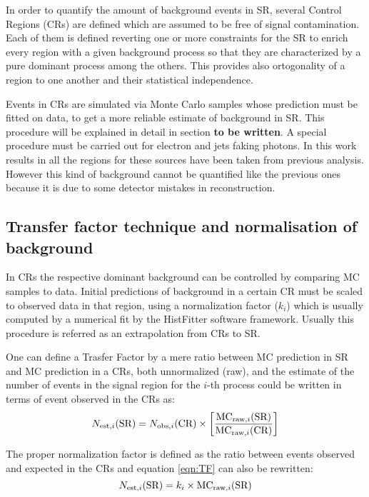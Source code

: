 \begin{description}
In order to quantify the amount of background events in SR, several Control Regions (CRs) are defined which are assumed to be free of signal contamination. Each of them is defined reverting one or more constraints for the SR to enrich every region with a given background process so that they are characterized by a pure dominant process among the others. This provides also ortogonality of a region to one another and their statistical independence.

Events in CRs are simulated via Monte Carlo samples whose prediction must be fitted on data, to get a more reliable estimate of background in SR. This procedure will be explained in detail in section {\bfseries to be written}. A special procedure must be carried out for electron and jets faking photons. In this work results in all the regions for these sources have been taken from previous analysis. However this kind of background cannot be quantified like the previous ones because it is due to some detector mistakes in reconstruction.



\subsection{Transfer factor technique and normalisation of background}
In CRs the respective dominant background can be controlled by comparing MC samples to data. Initial predictions of background in a certain CR must be scaled to observed data in that region, using a normalization factor ($k_{i}$) which is usually computed by a numerical fit by the HistFitter software framework. Usually this procedure is referred as an extrapolation from CRs to SR.

One can define a Trasfer Factor by a mere ratio between MC prediction in SR and MC prediction in a CRs, both unnormalized (raw), and the estimate of the number of events in the signal region for the $i$-th process could be written in terms of event observed in the CRs as:
\begin{equation}
  \label{eqn:TF}
  N_{\textup{est},i}(\text{SR}) =  N_{\textup{obs},i}({\text{CR}}) \times \left[\frac{\text{MC}_{\textup{raw},i}(\text{SR})}{\text{MC}_{\textup{raw},i}(\text{CR})} \right]
\end{equation}

The proper normalization factor is defined as the ratio between events observed and expected in the CRs and equation \ref{eqn:TF} can also be rewritten:
\begin{equation}
  N_{\textup{est},i}(\text{SR}) = k_{i}\times\text{MC}_{\textup{raw},i}(\text{SR})
\end{equation}


\end{description}
